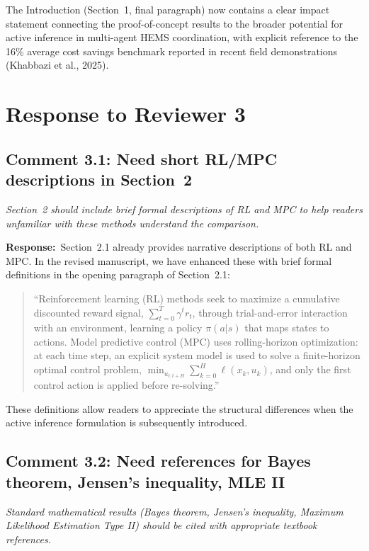 \documentclass[11pt]{article}
\newcommand{\reviewercomment}[1]{\textit{#1}}
\newcommand{\response}{\textbf{Response:}\ }
\begin{document}
The Introduction (Section~1, final paragraph) now contains a clear impact statement connecting the proof-of-concept results to the broader potential for active inference in multi-agent HEMS coordination, with explicit reference to the 16\% average cost savings benchmark reported in recent field demonstrations (Khabbazi et al., 2025).

\section*{Response to Reviewer 3}

\subsection*{Comment 3.1: Need short RL/MPC descriptions in Section~2}

\reviewercomment{Section~2 should include brief formal descriptions of RL and MPC to help readers unfamiliar with these methods understand the comparison.}

\response Section~2.1 already provides narrative descriptions of both RL and MPC. In the revised manuscript, we have enhanced these with brief formal definitions in the opening paragraph of Section~2.1:

\begin{quote}
``Reinforcement learning (RL) methods seek to maximize a cumulative discounted reward signal, $\sum_{t=0}^{T} \gamma^t r_t$, through trial-and-error interaction with an environment, learning a policy $\pi(a|s)$ that maps states to actions. Model predictive control (MPC) uses rolling-horizon optimization: at each time step, an explicit system model is used to solve a finite-horizon optimal control problem, $\min_{u_{t:t+H}} \sum_{k=0}^{H} \ell(x_k, u_k)$, and only the first control action is applied before re-solving.''
\end{quote}

These definitions allow readers to appreciate the structural differences when the active inference formulation is subsequently introduced.

\subsection*{Comment 3.2: Need references for Bayes theorem, Jensen's inequality, MLE II}

\reviewercomment{Standard mathematical results (Bayes theorem, Jensen's inequality, Maximum Likelihood Estimation Type II) should be cited with appropriate textbook references.}
\end{document}
